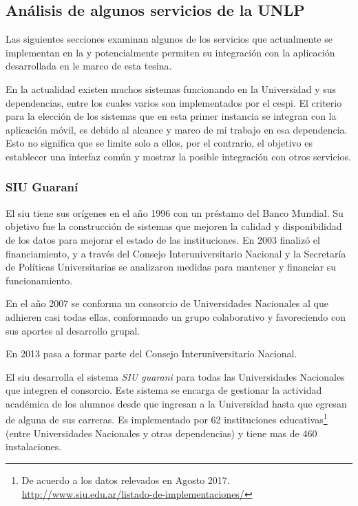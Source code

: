\subsection{Análisis de algunos servicios de la UNLP}
\label{analisis_servicios_unlp}

Las siguientes secciones examinan algunos de los servicios que actualmente se implementan en la \unlp{} y potencialmente permiten su integración con la aplicación desarrollada en le marco de esta tesina.

En la actualidad existen muchos sistemas funcionando en la Universidad y sus dependencias, entre los cuales varios son implementados por el \gls{cespi}. El criterio para la elección de los sistemas que en esta primer instancia se integran con la aplicación móvil, es debido al alcance y marco de mi trabajo en esa dependencia.
Esto no significa que se limite solo a ellos, por el contrario, el objetivo es establecer una interfaz común y mostrar la posible integración con otros servicios.

\subsubsection{SIU Guaraní}
\label{guarani}

El \gls{siu} tiene sus orígenes en el año 1996 con un préstamo del Banco Mundial. Su objetivo fue la construcción de sistemas que mejoren la calidad y disponibilidad de los datos para mejorar el estado de las instituciones\cite{siu}. En 2003 finalizó el financiamiento, y a través del Consejo Interuniversitario Nacional y la Secretaría de Políticas Universitarias se analizaron medidas para mantener y financiar su funcionamiento.

En el año 2007 se conforma un consorcio de Universidades Nacionales al que adhieren casi todas ellas, conformando un grupo colaborativo y favoreciendo con sus aportes al desarrollo grupal.

En 2013 pasa a formar parte del Consejo Interuniversitario Nacional.

El \gls{siu} desarrolla el sistema \textit{SIU \gls{guarani}} para todas las Universidades Nacionales que integren el consorcio. Este sistema se encarga de gestionar la actividad académica de los alumnos desde que ingresan a la Universidad hasta que egresan de alguna de sus carreras. Es implementado por 62 instituciones educativas\footnote{De acuerdo a los datos relevados en Agosto 2017. \url{http://www.siu.edu.ar/listado-de-implementaciones/}} (entre Universidades Nacionales y otras dependencias) y tiene mas de 460 instalaciones.


